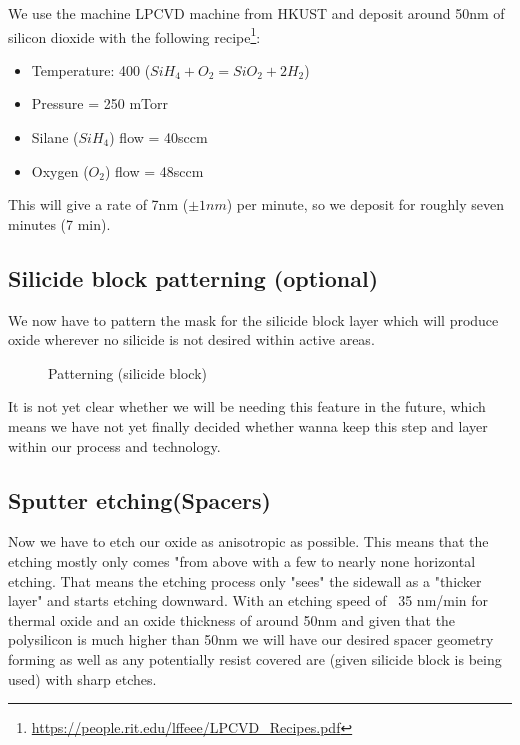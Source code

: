 We use the machine LPCVD machine from HKUST and deposit around 50nm of silicon dioxide with the following recipe\footnote{\url{https://people.rit.edu/lffeee/LPCVD_Recipes.pdf}}:
\begin{itemize}
	\item Temperature: 400 \degreesC  ($Si H_4 + O_2 = Si O_2 + 2 H_2$)
	\item Pressure = 250 mTorr
	\item Silane ($Si H_4$) flow = 40sccm
	\item Oxygen ($O_2$) flow = 48sccm
\end{itemize}

This will give a rate of 7nm ($\pm 1nm$) per minute, so we deposit for roughly seven minutes (7 min).

\subsection{Silicide block patterning (optional)}

We now have to pattern the mask for the silicide block layer which will produce oxide wherever no silicide is not desired within active areas.

\begin{figure}[H]
	\centering
	\begin{tikzpicture}[node distance = 3cm, auto, thick,scale=\CrossSectionOnly, every node/.style={transform shape}]
		
	\end{tikzpicture}
	\begin{tikzpicture}[node distance = 3cm, auto, thick,scale=\CrossSectionOnly, every node/.style={transform shape}]
		
	\end{tikzpicture}
	\caption{Patterning (silicide block)}
\end{figure}

It is not yet clear whether we will be needing this feature in the future, which means we have not yet finally decided whether wanna keep this step and layer within our process and technology.

\newpage

\subsection{Sputter etching(Spacers)}

Now we have to etch our oxide as anisotropic as possible. This means that the etching mostly only comes "from above with a few to nearly none horizontal etching.
That means the etching process only "sees" the sidewall as a "thicker layer" and starts etching downward.
With an etching speed of ~35 nm/min for thermal oxide and an oxide thickness of around 50nm and given that the polysilicon is much higher than 50nm we will have our desired spacer geometry forming as well as any potentially resist covered are (given silicide block is being used) with sharp etches.

